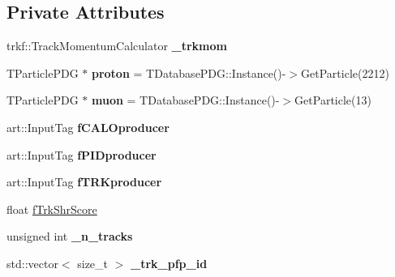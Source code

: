 \subsection*{Private Attributes}
\begin{DoxyCompactItemize}
\item 
trkf\+::\+Track\+Momentum\+Calculator {\bfseries \+\_\+trkmom}\hypertarget{classanalysis_1_1TrackAnalysis_aa69136b70c77e0f034fe009b86ba591b}{}\label{classanalysis_1_1TrackAnalysis_aa69136b70c77e0f034fe009b86ba591b}

\item 
T\+Particle\+P\+DG $\ast$ {\bfseries proton} = T\+Database\+P\+D\+G\+::\+Instance()-\/$>$Get\+Particle(2212)\hypertarget{classanalysis_1_1TrackAnalysis_a4adc7f89c334ab93747a8d4c4abbcc6d}{}\label{classanalysis_1_1TrackAnalysis_a4adc7f89c334ab93747a8d4c4abbcc6d}

\item 
T\+Particle\+P\+DG $\ast$ {\bfseries muon} = T\+Database\+P\+D\+G\+::\+Instance()-\/$>$Get\+Particle(13)\hypertarget{classanalysis_1_1TrackAnalysis_a0fe3b9e7864aaaa36b5f52826b4e3eb9}{}\label{classanalysis_1_1TrackAnalysis_a0fe3b9e7864aaaa36b5f52826b4e3eb9}

\item 
art\+::\+Input\+Tag {\bfseries f\+C\+A\+L\+Oproducer}\hypertarget{classanalysis_1_1TrackAnalysis_a0ceaf940b041eda0237cc73cd330d18d}{}\label{classanalysis_1_1TrackAnalysis_a0ceaf940b041eda0237cc73cd330d18d}

\item 
art\+::\+Input\+Tag {\bfseries f\+P\+I\+Dproducer}\hypertarget{classanalysis_1_1TrackAnalysis_a349dc117e508190c619cd9f47ea7647e}{}\label{classanalysis_1_1TrackAnalysis_a349dc117e508190c619cd9f47ea7647e}

\item 
art\+::\+Input\+Tag {\bfseries f\+T\+R\+Kproducer}\hypertarget{classanalysis_1_1TrackAnalysis_a45abdcf3140e68a2ce90501e33a00eb3}{}\label{classanalysis_1_1TrackAnalysis_a45abdcf3140e68a2ce90501e33a00eb3}

\item 
float \hyperlink{classanalysis_1_1TrackAnalysis_a49502213574f13be542aaab647940ffd}{f\+Trk\+Shr\+Score}
\item 
unsigned int {\bfseries \+\_\+n\+\_\+tracks}\hypertarget{classanalysis_1_1TrackAnalysis_a965f2969aac19332af4597a364586c5d}{}\label{classanalysis_1_1TrackAnalysis_a965f2969aac19332af4597a364586c5d}

\item 
std\+::vector$<$ size\+\_\+t $>$ {\bfseries \+\_\+trk\+\_\+pfp\+\_\+id}\hypertarget{classanalysis_1_1TrackAnalysis_a6ff6b242cbf5345bc77a2a574218ccd9}{}\label{classanalysis_1_1TrackAnalysis_a6ff6b242cbf5345bc77a2a574218ccd9}


\end{DoxyCompactItemize}
